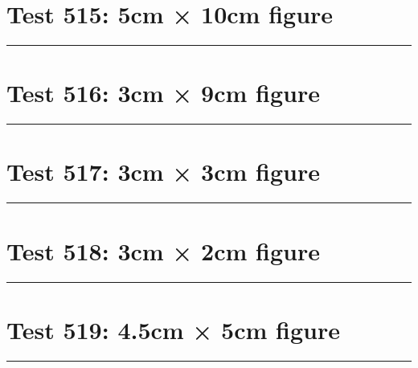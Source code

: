 \documentclass[a4paper,11pt]{article}
\begin{document}
\section*{Test 515: 5cm × 10cm figure}
\begin{swarmwrap}%
  \begin{minipage}[t]{5cm}
    \centering
    \rule{\linewidth}{10cm}
  \end{minipage}%
\end{swarmwrap}%
\swarmwrapnext
\lipsum[146]
\lipsum[147]
\lipsum[148]
\lipsum[149]
\lipsum[150]
\lipsum[1]
\section*{Test 516: 3cm × 9cm figure}
\begin{swarmwrap}%
  \begin{minipage}[t]{3cm}
    \centering
    \rule{\linewidth}{9cm}
  \end{minipage}%
\end{swarmwrap}%
\swarmwrapnext
\lipsum[96]
\lipsum[97]
\lipsum[98]
\section*{Test 517: 3cm × 3cm figure}
\begin{swarmwrap}%
  \begin{minipage}[t]{3cm}
    \centering
    \rule{\linewidth}{3cm}
  \end{minipage}%
\end{swarmwrap}%
\swarmwrapnext
\lipsum[1]
\lipsum[2]
\lipsum[3]
\lipsum[4]
\lipsum[5]
\lipsum[6]
\section*{Test 518: 3cm × 2cm figure}
\begin{swarmwrap}%
  \begin{minipage}[t]{3cm}
    \centering
    \rule{\linewidth}{2cm}
  \end{minipage}%
\end{swarmwrap}%
\swarmwrapnext
\lipsum[69]
\lipsum[70]
\lipsum[71]
\lipsum[72]
\lipsum[73]
\lipsum[74]
\section*{Test 519: 4.5cm × 5cm figure}
\begin{swarmwrap}%
  \begin{minipage}[t]{4cm}
    \centering
    \rule{\linewidth}{5cm}
  \end{minipage}%
\end{swarmwrap}%
\swarmwrapnext
\lipsum[1]
\lipsum[2]
\lipsum[3]
\end{document}
